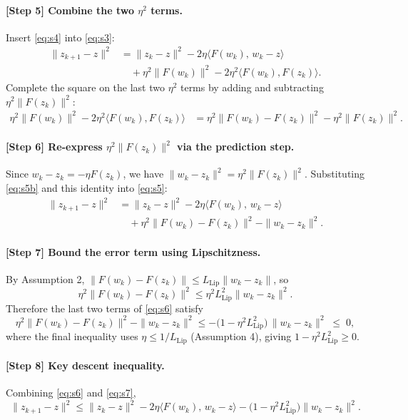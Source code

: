 \documentclass{article}
\begin{document}
\paragraph{[Step 5] Combine the two $\eta^2$ terms.}
Insert \eqref{eq:s4} into \eqref{eq:s3}:
\begin{align}
\|z_{k+1}-z\|^2
&= \|z_k - z\|^2 - 2\eta \langle F(w_k),\, w_k - z\rangle \nonumber\\
&\quad + \eta^2\|F(w_k)\|^2 - 2\eta^2\langle F(w_k),F(z_k)\rangle.
\label{eq:s5}
\end{align}
Complete the square on the last two $\eta^2$ terms by adding and
subtracting $\eta^2\|F(z_k)\|^2$:
\begin{align}
\eta^2\|F(w_k)\|^2 - 2\eta^2\langle F(w_k),F(z_k)\rangle
&= \eta^2\|F(w_k)-F(z_k)\|^2 - \eta^2\|F(z_k)\|^2. \label{eq:s5b}
\end{align}

\paragraph{[Step 6] Re-express $\eta^2\|F(z_k)\|^2$ via the prediction step.}
Since $w_k - z_k = -\eta F(z_k)$, we have
$\|w_k - z_k\|^2 = \eta^2 \|F(z_k)\|^2$. Substituting \eqref{eq:s5b}
and this identity into \eqref{eq:s5}:
\begin{align}
\|z_{k+1}-z\|^2
&= \|z_k - z\|^2 - 2\eta \langle F(w_k),\, w_k - z\rangle \nonumber\\
&\quad + \eta^2\|F(w_k)-F(z_k)\|^2 - \|w_k - z_k\|^2. \label{eq:s6}
\end{align}

\paragraph{[Step 7] Bound the error term using Lipschitzness.}
By Assumption 2, $\|F(w_k)-F(z_k)\| \le L_{\mathrm{Lip}}\|w_k - z_k\|$, so
\[
\eta^2\|F(w_k)-F(z_k)\|^2 \le \eta^2 L_{\mathrm{Lip}}^2\|w_k-z_k\|^2.
\]
Therefore the last two terms of \eqref{eq:s6} satisfy
\begin{equation}
\label{eq:s7}
\eta^2\|F(w_k)-F(z_k)\|^2 - \|w_k - z_k\|^2
\le -\big(1-\eta^2 L_{\mathrm{Lip}}^2\big)\,\|w_k - z_k\|^2 \;\le\; 0,
\end{equation}
where the final inequality uses $\eta \le 1/L_{\mathrm{Lip}}$
(Assumption 4), giving $1-\eta^2 L_{\mathrm{Lip}}^2 \ge 0$.

\paragraph{[Step 8] Key descent inequality.}
Combining \eqref{eq:s6} and \eqref{eq:s7},
\begin{equation}
\label{eq:s8}
\|z_{k+1}-z\|^2 \le \|z_k - z\|^2
- 2\eta \langle F(w_k),\, w_k - z\rangle
- \big(1-\eta^2 L_{\mathrm{Lip}}^2\big)\|w_k-z_k\|^2.
\end{equation}
\end{document}
